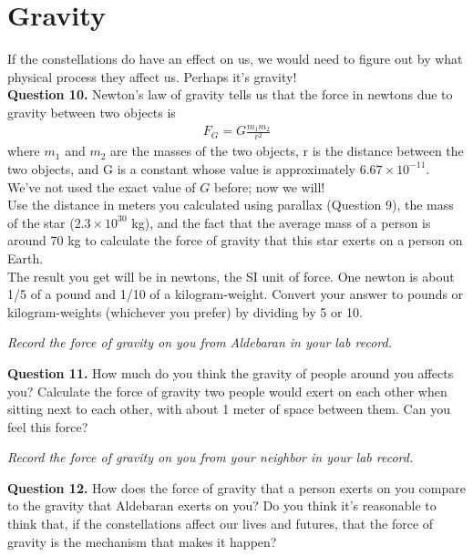 \documentclass[11pt]{article}
\begin{document}
\section{Gravity}
If the constellations do have an effect on us, we would need to figure out by what physical process they affect us. Perhaps it's gravity!\\

\textbf{Question 10.} Newton's law of gravity tells us that the force in newtons due to gravity between two objects is
\begin{align*}
F_G=G\frac{m_1 m_2}{r^2}
\end{align*}
where $m_1$ and $m_2$ are the masses of the two objects, r is the distance between the two objects, and G is a constant whose value is approximately $6.67\times 10^{-11}$. We've not used the exact value of $G$ before; now we will!\\

Use the distance in meters you calculated using parallax (Question 9), the mass of the star ($2.3\times 10^{30}$ kg), and the fact that the average mass of a person is around 70 kg to calculate the force of gravity that this star exerts on a person on Earth.\\

The result you get will be in newtons, the SI unit of force. One newton is about 1/5 of a pound and 1/10 of a kilogram-weight. Convert your answer to pounds or kilogram-weights (whichever you prefer) by dividing by 5 or 10. 

\vspace{1em}

{\it Record the force of gravity on you from Aldebaran in your lab record.}
\vspace{2em}

\textbf{Question 11.} How much do you think the gravity of people around you affects you? Calculate the force of gravity two people would exert on each other when sitting next to each other, with about 1 meter of space between them. Can you feel this force?
\vspace{1em}

{\it Record the force of gravity on you from your neighbor in your lab record.}
\vspace{2em}

\textbf{Question 12.} How does the force of gravity that a person exerts on you compare to the gravity that Aldebaran exerts on you? Do you think it's reasonable to think that, if the constellations affect our lives and futures, that the force of gravity is the mechanism that makes it happen? \\
%
\end{document}
